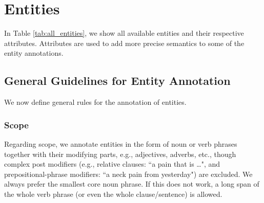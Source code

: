 \documentclass[12pt]{article}
\theoremstyle{definition}
\newcommand{\dis}{\texttt{disorder}\xspace}
\newcommand{\dr}{\texttt{drug}\xspace}
\begin{document}
\section{Entities}\label{sec:entities}

In Table \ref{tab:all_entities}, we show all available entities and their respective attributes.
Attributes are used to add more precise semantics to some of the entity annotations.






\subsection{General Guidelines for Entity Annotation}

We now define general rules for the annotation of entities.

\subsubsection*{Scope}

Regarding scope, we annotate entities in the form of noun or verb phrases together with their modifying parts, e.g., adjectives, adverbs, etc., though complex post modifiers (e.g., relative clauses: ``a pain that is \ldots", and prepositional-phrase modifiers: ``a neck pain from yesterday") are excluded.
We always prefer the smallest core noun phrase. 
If this does not work, a long span of the whole verb phrase (or even the whole clause/sentence) is allowed.
\end{document}

